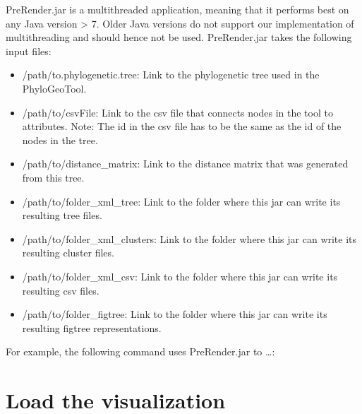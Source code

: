 \documentclass[a4paper, 11pt]{article} %
\begin{document}
PreRender.jar is a multithreaded application, meaning that it performs best on any Java version > 7. 
Older Java versions do not support our implementation of multithreading and should hence not be used.
PreRender.jar takes the following input files: %
\begin{itemize}
\item /path/to.phylogenetic.tree: Link to the phylogenetic tree used in the PhyloGeoTool.
\item /path/to/csvFile: Link to the csv file that connects nodes in the tool to attributes. Note: The id in the csv file has to be the same as the id of the nodes in the tree.
\item /path/to/distance\_matrix: Link to the distance matrix that was generated from this tree.
\item /path/to/folder\_xml\_tree: Link to the folder where this jar can write its resulting tree files.
\item /path/to/folder\_xml\_clusters: Link to the folder where this jar can write its resulting cluster files.
\item /path/to/folder\_xml\_csv: Link to the folder where this jar can write its resulting csv files.
\item /path/to/folder\_figtree: Link to the folder where this jar can write its resulting figtree representations.
\end{itemize}

For example, the following command uses PreRender.jar to \ldots: %


\section{Load the visualization}
\end{document}
